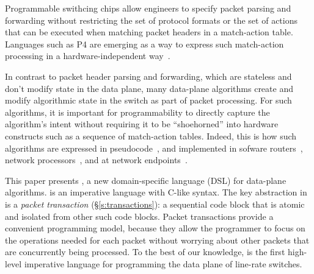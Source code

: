 Programmable swithcing chips allow engineers to specify packet parsing and
forwarding without restricting the set of protocol formats or the set
of actions that can be executed when matching packet headers in a
match-action table. Languages such as P4 are emerging as a way to
express such match-action processing in a hardware-independent
way~\cite{p4,p4spec,dc_p4}.


In contrast to packet header parsing and forwarding, which are stateless
and don't modify state in the data plane, many data-plane algorithms
create and modify algorithmic state in the switch as part of packet
processing. For such algorithms, it is important for programmability to
directly capture the algorithm's intent without requiring it to be
``shoehorned'' into hardware constructs such as a sequence of
match-action tables. Indeed, this is how such algorithms are expressed
in pseudocode~\cite{red, csfq, codel_code, avq, blue}, and implemented
in sofware routers~\cite{click, dpdk, routebricks}, network
processors~\cite{packetc, nova}, and at network
endpoints~\cite{qdisc}.

This paper presents \pktlanguage, a new domain-specific language (DSL)
for data-plane algorithms.  \pktlanguage is an imperative language
with C-like syntax. The key abstraction in \pktlanguage is a {\em
  packet transaction} (\S\ref{s:transactions}): a sequential code
block that is atomic and isolated from other such code blocks. Packet
transactions provide a convenient programming model, because they
allow the programmer to focus on the operations needed for each packet
without worrying about other packets that are concurrently being
processed. To the best of our knowledge, \pktlanguage is the first
high-level imperative language for programming the data plane of
line-rate switches.

